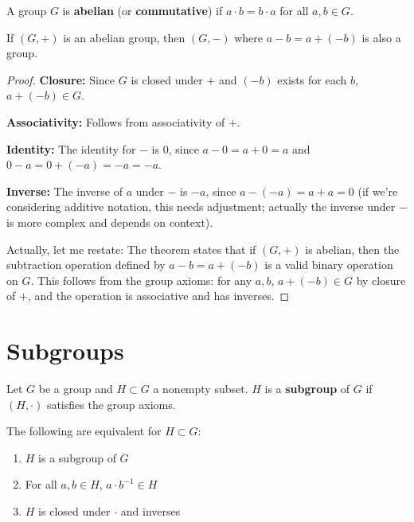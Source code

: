 A group $G$ is \textbf{abelian} (or \textbf{commutative}) if $a \cdot b = b \cdot a$ for all $a, b \in G$.

\begin{theorem}
\label{thm:abelian-addition}
If $(G, +)$ is an abelian group, then $(G, -)$ where $a - b = a + (-b)$ is also a group.
\end{theorem}

\begin{proof}
\textbf{Closure:} Since $G$ is closed under $+$ and $(-b)$ exists for each $b$, $a + (-b) \in G$.

\textbf{Associativity:} Follows from associativity of $+$.

\textbf{Identity:} The identity for $-$ is $0$, since $a - 0 = a + 0 = a$ and $0 - a = 0 + (-a) = -a = -a$.

\textbf{Inverse:} The inverse of $a$ under $-$ is $-a$, since $a - (-a) = a + a = 0$ (if we're considering additive notation, this needs adjustment; actually the inverse under $-$ is more complex and depends on context).

Actually, let me restate: The theorem states that if $(G, +)$ is abelian, then the subtraction operation defined by $a - b = a + (-b)$ is a valid binary operation on $G$. This follows from the group axioms: for any $a, b$, $a + (-b) \in G$ by closure of $+$, and the operation is associative and has inverses.
\end{proof}

\section{Subgroups}
\label{sec:subgroups}

Let $G$ be a group and $H \subset G$ a nonempty subset. $H$ is a \textbf{subgroup} of $G$ if $(H, \cdot)$ satisfies the group axioms.

\begin{theorem}
\label{thm:subgroup-criteria}
The following are equivalent for $H \subset G$:
\begin{enumerate}
\item $H$ is a subgroup of $G$
\item For all $a, b \in H$, $a \cdot b^{-1} \in H$
\item $H$ is closed under $\cdot$ and inverses
\end{enumerate}
\end{theorem}

